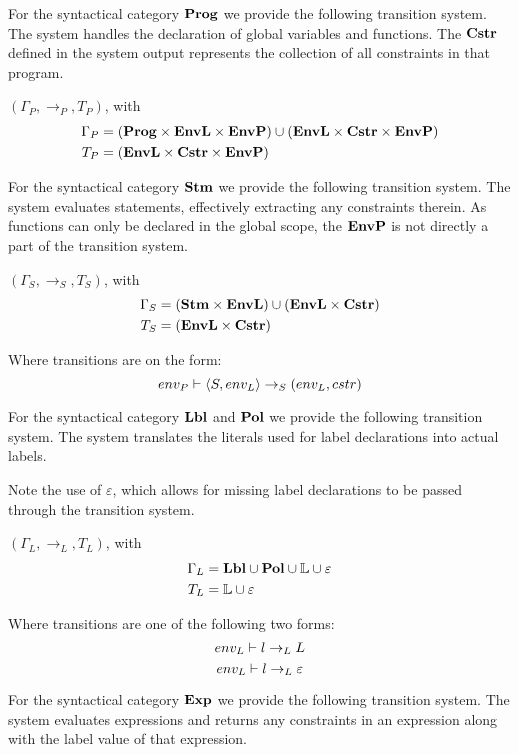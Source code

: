 For the syntactical category $\mathbf{Prog}$ we provide the following transition system.
The system handles the declaration of global variables and functions.
The $\mathbf{Cstr}$ defined in the system output represents the collection of all constraints in that program.

$(\Gamma_P, \rightarrow_P, T_P)$, with
\begin{align*}
  \Gamma_P  & = (\mathbf{Prog} \times \mathbf{EnvL} \times \mathbf{EnvP}) \cup (\mathbf{EnvL} \times \mathbf{Cstr} \times \mathbf{EnvP}) \\
  T_P       & = (\mathbf{EnvL} \times \mathbf{Cstr} \times \mathbf{EnvP})
\end{align*}

For the syntactical category $\mathbf{Stm}$ we provide the following transition system.
The system evaluates statements, effectively extracting any constraints therein.
As functions can only be declared in the global scope, the $\mathbf{EnvP}$ is not directly a part of the transition system.

$(\Gamma_S, \rightarrow_S, T_S)$, with
\begin{align*}
  \Gamma_S & = (\mathbf{Stm} \times \mathbf{EnvL}) \cup (\mathbf{EnvL} \times \mathbf{Cstr}) \\
  T_S & = (\mathbf{EnvL} \times \mathbf{Cstr})
\end{align*}

Where transitions are on the form:
\[ {env_P} \vdash \langle S, {env_L} \rangle \rightarrow_{S} ({env_L}, {cstr}) \]

For the syntactical category $\mathbf{Lbl}$ and $\mathbf{Pol}$ we provide the following transition system.
The system translates the literals used for label declarations into actual labels.

Note the use of $\varepsilon$, which allows for missing label declarations to be passed through the transition system.

$(\Gamma_L, \rightarrow_L, T_L)$, with
\begin{align*}
  \Gamma_L & = \mathbf{Lbl} \cup \mathbf{Pol} \cup \mathbb{L} \cup \varepsilon \\
  T_L & = \mathbb{L} \cup \varepsilon
\end{align*}

Where transitions are one of the following two forms:
\[ {env_L} \vdash l \rightarrow_L L \]
\[ {env_L} \vdash l \rightarrow_L \varepsilon \]

For the syntactical category $\mathbf{Exp}$ we provide the following transition system.
The system evaluates expressions and returns any constraints in an expression along with the label value of that expression.

